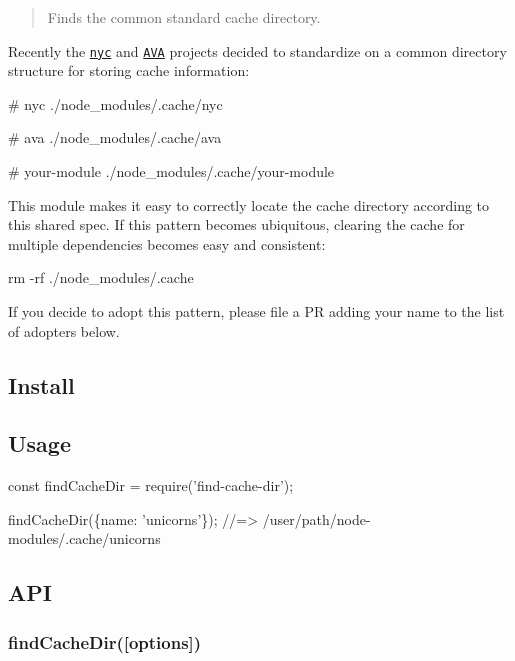 \begin{quote}
Finds the common standard cache directory. \end{quote}


Recently the \href{https://www.npmjs.com/package/nyc}{\tt {\ttfamily nyc}} and \href{https://www.npmjs.com/package/ava}{\tt {\ttfamily A\+VA}} projects decided to standardize on a common directory structure for storing cache information\+:


\begin{DoxyCode}
# nyc
./node\_modules/.cache/nyc

# ava
./node\_modules/.cache/ava

# your-module
./node\_modules/.cache/your-module
\end{DoxyCode}


This module makes it easy to correctly locate the cache directory according to this shared spec. If this pattern becomes ubiquitous, clearing the cache for multiple dependencies becomes easy and consistent\+:


\begin{DoxyCode}
rm -rf ./node\_modules/.cache
\end{DoxyCode}


If you decide to adopt this pattern, please file a PR adding your name to the list of adopters below.

\subsection*{Install}




\subsection*{Usage}


\begin{DoxyCode}
const findCacheDir = require('find-cache-dir');

findCacheDir(\{name: 'unicorns'\});
//=> /user/path/node-modules/.cache/unicorns
\end{DoxyCode}


\subsection*{A\+PI}

\subsubsection*{find\+Cache\+Dir(\mbox{[}options\mbox{]})}

